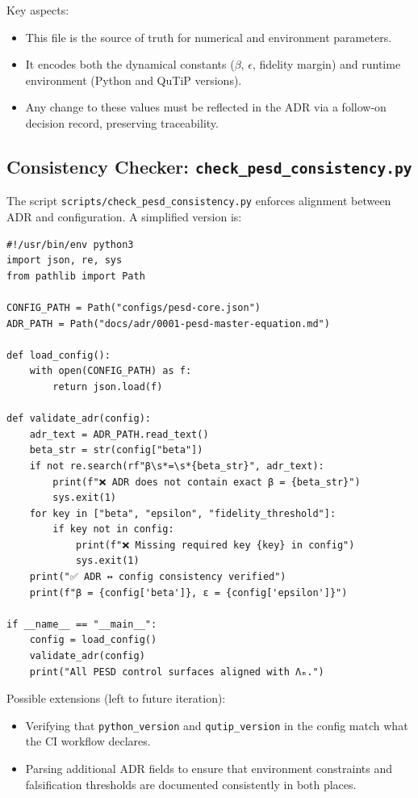 \documentclass[11pt]{article}
\begin{document}
Key aspects:

\begin{itemize}[nosep]
  \item This file is the source of truth for numerical and environment parameters.
  \item It encodes both the dynamical constants (\(\beta\), \(\epsilon\), fidelity margin) and runtime environment (Python and QuTiP versions).
  \item Any change to these values must be reflected in the ADR via a follow-on decision record, preserving traceability.
\end{itemize}

\subsection{Consistency Checker: \texttt{check\_pesd\_consistency.py}}

The script \texttt{scripts/check\_pesd\_consistency.py} enforces alignment between ADR and configuration. A simplified version is:

\begin{verbatim}
#!/usr/bin/env python3
import json, re, sys
from pathlib import Path

CONFIG_PATH = Path("configs/pesd-core.json")
ADR_PATH = Path("docs/adr/0001-pesd-master-equation.md")

def load_config():
    with open(CONFIG_PATH) as f:
        return json.load(f)

def validate_adr(config):
    adr_text = ADR_PATH.read_text()
    beta_str = str(config["beta"])
    if not re.search(rf"β\s*=\s*{beta_str}", adr_text):
        print(f"❌ ADR does not contain exact β = {beta_str}")
        sys.exit(1)
    for key in ["beta", "epsilon", "fidelity_threshold"]:
        if key not in config:
            print(f"❌ Missing required key {key} in config")
            sys.exit(1)
    print("✅ ADR ↔ config consistency verified")
    print(f"β = {config['beta']}, ε = {config['epsilon']}")

if __name__ == "__main__":
    config = load_config()
    validate_adr(config)
    print("All PESD control surfaces aligned with Λₘ.")
\end{verbatim}

Possible extensions (left to future iteration):

\begin{itemize}[nosep]
  \item Verifying that \texttt{python\_version} and \texttt{qutip\_version} in the config match what the CI workflow declares.
  \item Parsing additional ADR fields to ensure that environment constraints and falsification thresholds are documented consistently in both places.
\end{itemize}
\end{document}
